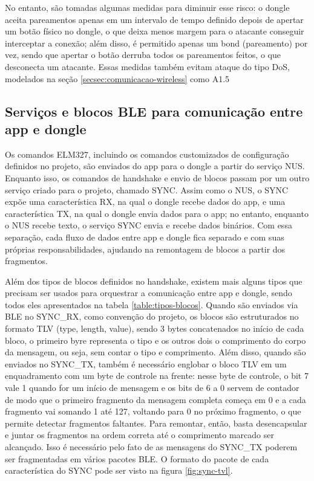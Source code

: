 \documentclass[
	12pt,
	article,			%
	oneside,
	a4paper,
	english,
	brazil				%
	]{abntex2}
\begin{document}
No entanto, são tomadas algumas medidas para diminuir esse risco:
o dongle aceita pareamentos apenas em um intervalo de tempo definido depois de apertar um botão físico no dongle, o que deixa menos
margem para o atacante conseguir interceptar a conexão; além disso, é permitido apenas um bond (pareamento) por vez, sendo que apertar o 
botão derruba todos os pareamentos feitos, o que desconecta um atacante. Essas medidas também evitam ataque do tipo DoS, modelados 
na seção \ref{secsec:comunicacao-wireless} como A1.5

\subsection{Serviços e blocos BLE para comunicação entre app e dongle} \label{sec:app-ble-dongle}

Os comandos ELM327, incluindo os comandos customizados de configuração definidos no projeto, são enviados do app para o dongle a partir 
do serviço NUS. Enquanto isso, os comandos de handshake e envio de blocos passam por um outro serviço criado para o projeto, chamado 
SYNC. Assim como o NUS, o SYNC expõe uma característica RX, na qual o dongle recebe dados do app, e uma característica TX, na qual 
o dongle envia dados para o app; no entanto, enquanto o NUS recebe texto, o serviço SYNC envia e recebe dados binários. Com essa separação,
cada fluxo de dados entre app e dongle fica separado e com suas próprias responsabilidades, ajudando na remontagem de blocos a partir dos fragmentos.

Além dos tipos de blocos definidos no handshake, existem mais alguns tipos que precisam ser usados para orquestrar a comunicação entre app e dongle, sendo
todos eles apresentados na tabela \ref{table:tipos-blocos}. Quando são enviados via BLE no SYNC\_RX, como convenção do projeto, os blocos são estruturados no formato TLV (type, length, value), 
sendo 3 bytes concatenados no início de cada bloco, o primeiro byre representa o tipo e os outros dois o comprimento do corpo da mensagem, ou seja, sem contar o tipo e comprimento. Além disso, quando são
enviados no SYNC\_TX, também é necessário englobar o bloco TLV em um enquadramento com um byte de controle na frente: nesse byte de controle, o bit 7 vale 1 quando for um início de mensagem e os bits de 6 a 0
servem de contador de modo que o primeiro fragmento da mensagem completa começa em 0 e a cada fragmento vai somando 1 até 127, voltando para 0 no próximo fragmento, o que permite detectar fragmentos faltantes.
Para remontar, então, basta desencapsular e juntar os fragmentos na ordem correta até o comprimento marcado ser alcançado.
Isso é necessário pelo fato de as mensagens do SYNC\_TX poderem ser fragmentadas em vários pacotes BLE. O formato do pacote de cada característica do SYNC pode ser visto na figura \ref{fig:sync-tvl}.
\end{document}
